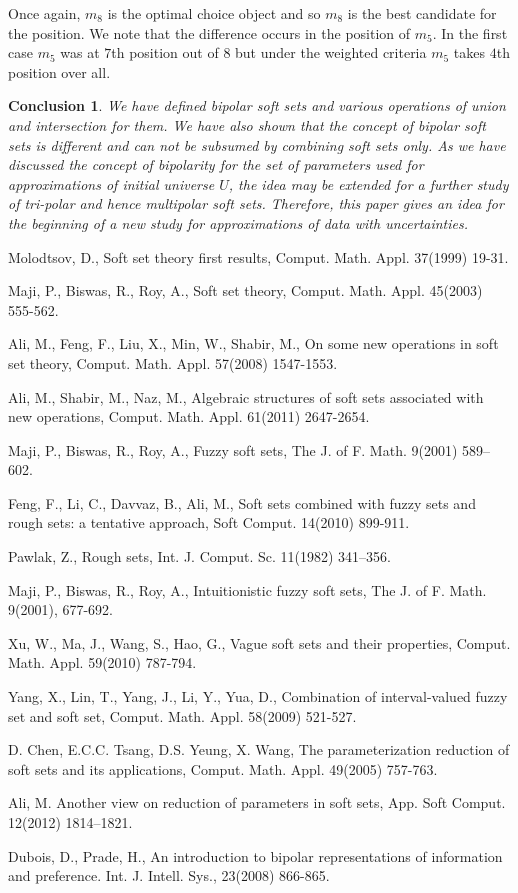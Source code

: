 \documentclass{amsart}
\theoremstyle{plain}
\newtheorem{conclusion}{Conclusion}
\numberwithin{equation}{section}
\begin{document}
Once again, $m_{8}$ is the optimal choice object and so $m_{8}$ is the best
candidate for the position. We note that the difference occurs in the
position of $m_{5}$. In the first case $m_{5}$ was at $7$th position out of $8$ but under the weighted criteria $m_{5}$ takes $4$th position over all.

\begin{conclusion}
We have defined bipolar soft sets and various operations of union and
intersection for them. We have also shown that the concept of bipolar soft
sets is different and can not be subsumed by combining soft sets only. As we
have discussed the concept of bipolarity for the set of parameters used for
approximations of initial universe $U$, the idea may be extended for a
further study of tri-polar and hence multipolar soft sets. Therefore, this
paper gives an idea for the beginning of a new study for approximations of
data with uncertainties.
\end{conclusion}

\begin{thebibliography}{10}
\bibitem[1]{[1]} Molodtsov, D., Soft set theory first results, Comput. Math.
Appl. 37(1999) 19-31.

\bibitem[2]{[2]} Maji, P., Biswas, R., Roy, A., Soft set theory, Comput.
Math. Appl. 45(2003) 555-562.

\bibitem[3]{[3]} Ali, M., Feng, F., Liu, X., Min, W., Shabir, M., On some
new operations in soft set theory, Comput. Math. Appl. 57(2008) 1547-1553.

\bibitem[4]{[4]} Ali, M., Shabir, M., Naz, M., Algebraic structures of soft
sets associated with new operations, Comput. Math. Appl. 61(2011) 2647-2654.

\bibitem[5]{[5]} Maji, P., Biswas, R., Roy, A., Fuzzy soft sets, The J. of
F. Math. 9(2001) 589--602.

\bibitem[6]{[6]} Feng, F., Li, C., Davvaz, B., Ali, M., Soft sets combined
with fuzzy sets and rough sets: a tentative approach, Soft Comput. 14(2010)
899-911.

\bibitem[7]{[7]} Pawlak, Z., Rough sets, Int. J. Comput. Sc. 11(1982)
341--356.

\bibitem[8]{[8]} Maji, P., Biswas, R., Roy, A., Intuitionistic fuzzy soft
sets, The J. of F. Math. 9(2001), 677-692.

\bibitem[9]{[9]} Xu, W., Ma, J., Wang, S., Hao, G., Vague soft sets and
their properties, Comput. Math. Appl. 59(2010) 787-794.

\bibitem[10]{[10]} Yang, X., Lin, T., Yang, J., Li, Y., Yua, D., Combination
of interval-valued fuzzy set and soft set, Comput. Math. Appl. 58(2009)
521-527.

\bibitem[11]{[11]} D. Chen, E.C.C. Tsang, D.S. Yeung, X. Wang, The
parameterization reduction of soft sets and its applications, Comput. Math.
Appl. 49(2005) 757-763.

\bibitem[12]{[12]} Ali, M. Another view on reduction of parameters in soft
sets, App. Soft Comput. 12(2012) 1814--1821.

\bibitem[13]{[13]} Dubois, D., Prade, H., An introduction to bipolar
representations of information and preference. Int. J. Intell. Sys.,
23(2008) 866-865.
\end{thebibliography}
\end{document}
